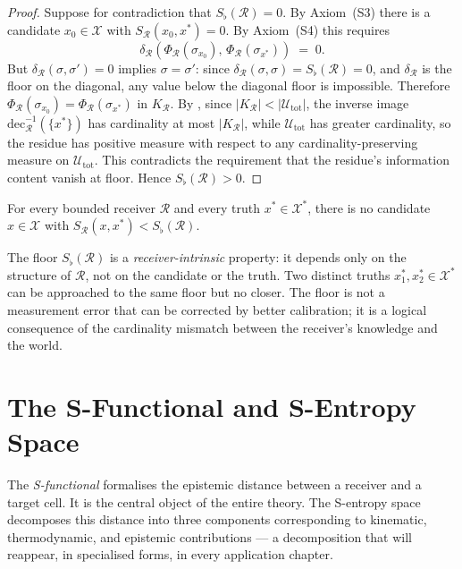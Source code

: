 \begin{proof}
Suppose for contradiction that $S_\flat(\mathcal{R}) = 0$.  By Axiom~(S3)
there is a candidate $x_0 \in \mathcal{X}$ with
$S_{\mathcal{R}}(x_0, x^{*}) = 0$.  By Axiom~(S4) this requires
\[
  \delta_{\mathcal{R}}(\Phi_{\mathcal{R}}(\sigma_{x_0}),\,
  \Phi_{\mathcal{R}}(\sigma_{x^{*}})) \;=\; 0 .
\]
But $\delta_{\mathcal{R}}(\sigma, \sigma') = 0$ implies $\sigma = \sigma'$:
since $\delta_{\mathcal{R}}(\sigma, \sigma) = S_\flat(\mathcal{R}) = 0$, and
$\delta_{\mathcal{R}}$ is the floor on the diagonal, any value below the
diagonal floor is impossible.  Therefore
$\Phi_{\mathcal{R}}(\sigma_{x_0}) = \Phi_{\mathcal{R}}(\sigma_{x^{*}})$ in
$K_{\mathcal{R}}$.  By , since
$|K_{\mathcal{R}}| < |\mathcal{U}_{\mathrm{tot}}|$, the inverse image
$\mathrm{dec}_{\mathcal{R}}^{-1}(\{x^{*}\})$ has cardinality at most
$|K_{\mathcal{R}}|$, while $\mathcal{U}_{\mathrm{tot}}$ has greater
cardinality, so the residue has positive measure with respect to any
cardinality-preserving measure on $\mathcal{U}_{\mathrm{tot}}$.  This
contradicts the requirement that the residue's information content vanish at
floor.  Hence $S_\flat(\mathcal{R}) > 0$.
\end{proof}

\begin{corollary}
\label{cor:smallest-knowable}
For every bounded receiver $\mathcal{R}$ and every truth
$x^{*} \in \mathcal{X}^{*}$, there is no candidate $x \in \mathcal{X}$
with $S_{\mathcal{R}}(x, x^{*}) < S_\flat(\mathcal{R})$.
\end{corollary}

\begin{remark}
The floor $S_\flat(\mathcal{R})$ is a \emph{receiver-intrinsic} property: it
depends only on the structure of $\mathcal{R}$, not on the candidate or the
truth.  Two distinct truths $x_1^*, x_2^* \in \mathcal{X}^{*}$ can be
approached to the same floor but no closer.  The floor is not a measurement
error that can be corrected by better calibration; it is a logical consequence
of the cardinality mismatch between the receiver's knowledge and the world.
\end{remark}

\section{The S-Functional and S-Entropy Space}
\label{sec:s-functional}

The \emph{S-functional} formalises the epistemic distance between a receiver
and a target cell.  It is the central object of the entire theory.  The
S-entropy space decomposes this distance into three components corresponding
to kinematic, thermodynamic, and epistemic contributions — a decomposition
that will reappear, in specialised forms, in every application chapter.

